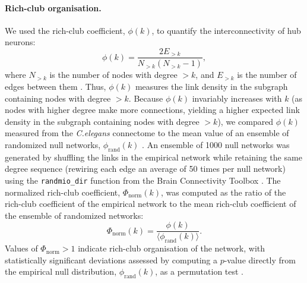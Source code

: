 \paragraph{Rich-club organisation.}
We used the rich-club coefficient, $\phi(k)$, to quantify the interconnectivity of hub neurons:
\begin{equation}
    \label{eqn:rich_club}
    \phi(k) = \frac{2E_{>k}}{N_{>k}(N_{>k}-1)},
\end{equation}
where $N_{>k}$ is the number of nodes with degree $>k$, and $E_{>k}$ is the number of edges between them \citep{Colizza2006}.
Thus, $\phi(k)$ measures the link density in the subgraph containing nodes with degree $>k$.
Because $\phi(k)$ invariably increases with $k$ (as nodes with higher degree make more connections, yielding a higher expected link density in the subgraph containing nodes with degree $>k$), we compared $\phi(k)$ measured from the \emph{C.elegans} connectome to the mean value of an ensemble of randomized null networks, $\phi_\mathrm{rand}(k)$ \citep{Colizza2006}.
An ensemble of 1000 null networks was generated by shuffling the links in the empirical network while retaining the same degree sequence \citep{Maslov2002} (rewiring each edge an average of 50 times per null network) using the \texttt{randmio\_dir} function from the Brain Connectivity Toolbox \citep{Rubinov2010}.
The normalized rich-club coefficient, $\Phi_\mathrm{norm}(k)$, was computed as the ratio of the rich-club coefficient of the empirical network to the mean rich-club coefficient of the ensemble of randomized networks:
\begin{equation}
    \label{eqn:rich_club_norm}
    \Phi_\mathrm{norm}(k) = \frac{\phi(k)}{\langle \phi_\mathrm{rand}(k) \rangle}.
\end{equation}
Values of $\Phi_\mathrm{norm} > 1$ indicate rich-club organisation of the network, with statistically significant deviations assessed by computing a $p$-value directly from the empirical null distribution, $\phi_\mathrm{rand}(k)$, as a permutation test \citep{VandenHeuvel2011}.

